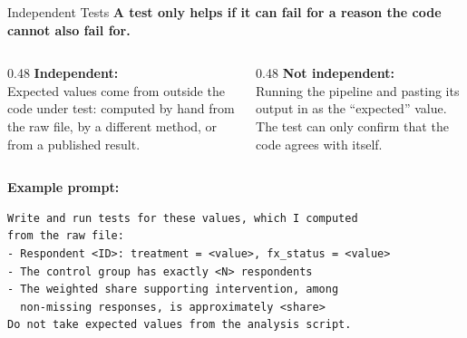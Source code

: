 \documentclass[aspectratio=169, 11pt]{beamer}
\begin{document}
\begin{frame}[fragile]{Independent Tests}
  \textbf{A test only helps if it can fail for a reason the code cannot also fail for.}

  \vspace{0.3em}
  \begin{columns}[T]
    \begin{column}{0.48\textwidth}
      \textbf{\color{green!50!black} Independent:}\\
      {\small Expected values come from outside the code under test: computed by hand from the raw file, by a different method, or from a published result.}
    \end{column}
    \begin{column}{0.48\textwidth}
      \textbf{\color{red!70!black} Not independent:}\\
      {\small Running the pipeline and pasting its output in as the ``expected'' value. The test can only confirm that the code agrees with itself.}
    \end{column}
  \end{columns}

  \vspace{0.3em}
  \textbf{Example prompt:}
  \begin{lstlisting}[basicstyle=\ttfamily\footnotesize]
Write and run tests for these values, which I computed
from the raw file:
- Respondent <ID>: treatment = <value>, fx_status = <value>
- The control group has exactly <N> respondents
- The weighted share supporting intervention, among
  non-missing responses, is approximately <share>
Do not take expected values from the analysis script.
  \end{lstlisting}
\end{frame}
\end{document}
